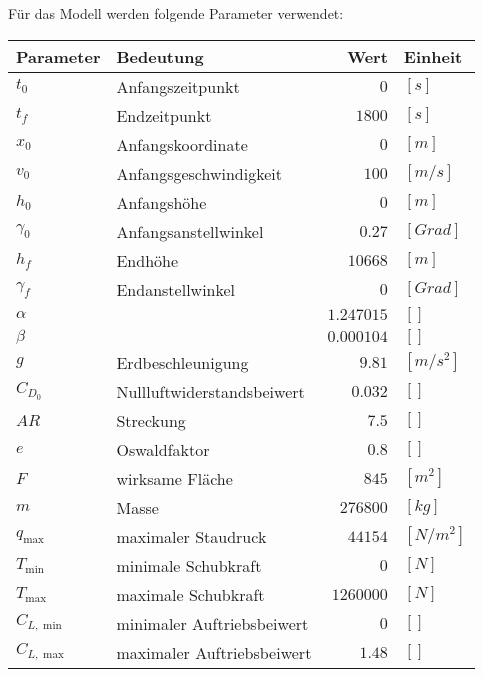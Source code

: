 Für das Modell werden folgende Parameter verwendet:
\begin{center}
\begin{tabular}{|l|l|r|l|}
\hline
Parameter & Bedeutung & Wert & Einheit \\ 
\hline 
\hline
$t_0$ & Anfangszeitpunkt & $0$ & $[s]$ \\ 
$t_f$ & Endzeitpunkt & $1800$ & $[s]$ \\ 
\hline
$x_0$ & Anfangskoordinate & $0$ & $[m]$ \\ 
$v_0$ & Anfangsgeschwindigkeit & $100$ & $[m/s]$ \\ 
$h_0$ & Anfangshöhe & $0$ & $[m]$ \\ 
$\gamma_0$ & Anfangsanstellwinkel & $0.27$ & $[Grad]$ \\
\hline
$h_f$ & Endhöhe & $10668$ & $[m]$ \\ 
$\gamma_f$ & Endanstellwinkel & $0$ & $[Grad]$ \\
\hline
$\alpha$ &  & $1.247015$ & $[]$ \\ 
$\beta$ &  & $0.000104$ & $[]$ \\
$g$ & Erdbeschleunigung & $9.81$ & $[m/s^2]$ \\ 
$C_{D_0}$ & Nullluftwiderstandsbeiwert & $0.032$ & $[]$ \\ 
$AR$ & Streckung & $7.5$ & $[]$ \\ 
$e$ & Oswaldfaktor & $0.8$ & $[]$ \\ 
$F$ & wirksame Fläche & $845$ & $[m^2]$ \\ 
$m$ & Masse & $276800$ & $[kg]$ \\ 
$q_{\max}$ & maximaler Staudruck & $44154$ & $[N/m^2]$ \\
$T_{\min}$ & minimale Schubkraft & $0$ & $[N]$ \\  
$T_{\max}$ & maximale Schubkraft & $1260000$ & $[N]$ \\ 
$C_{L, \min}$ & minimaler Auftriebsbeiwert & $0$ & $[]$ \\ 
$C_{L, \max}$ & maximaler Auftriebsbeiwert & $1.48$ & $[]$ \\ 
\hline
\end{tabular} 
\end{center}

